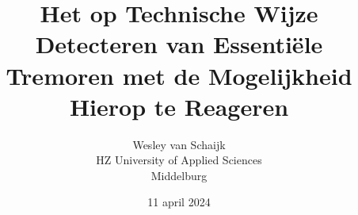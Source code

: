 \documentclass{article}
\title{Het op Technische Wijze Detecteren van Essentiële Tremoren met de Mogelijkheid Hierop te Reageren}
\author{Wesley van Schaijk \\ HZ University of Applied Sciences \\ Middelburg}
\date{11 april 2024}
\begin{document}
\maketitle




\newpage
\begin{multicols}{2}
    
    
    
    
    
    
    
\end{multicols}

{
    \newpage
    \raggedright
    
    
}

\newpage

\end{document}
